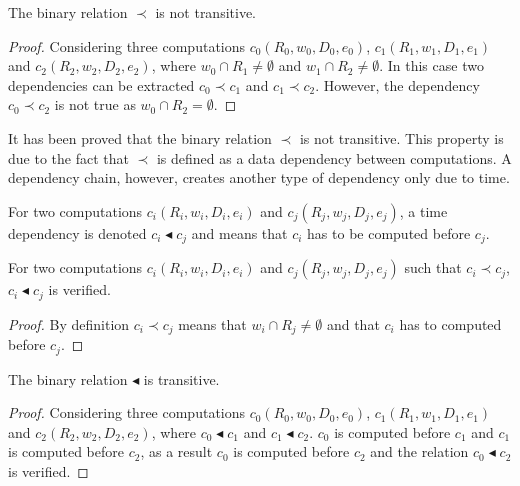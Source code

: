 \begin{myprop}
The binary relation $\prec$ is not transitive. 
\end{myprop}

\begin{proof}
Considering three computations $c_0(R_0,w_0,D_0,e_0)$, $c_1(R_1,w_1,D_1,e_1)$ and $c_2(R_2,w_2,D_2,e_2)$, where $w_0\cap R_1 \neq \emptyset$ and $w_1\cap R_2 \neq \emptyset$. In this case two dependencies can be extracted $c_0 \prec c_1$ and $c_1 \prec c_2$. However, the dependency $c_0 \prec c_2$ is not true as $w_0\cap R_2 = \emptyset$.
\end{proof}

It has been proved that the binary relation $\prec$ is not transitive. This property is due to the fact that $\prec$ is defined as a data dependency between computations. A dependency chain, however, creates another type of dependency only due to time.

\begin{mydef}
For two computations $c_i(R_i,w_i,D_i,e_i)$ and $c_j(R_j,w_j,D_j,e_j)$, a time dependency is denoted $c_i \blacktriangleleft c_j$ and means that $c_i$ has to be computed before $c_j$.
\end{mydef}

\begin{myprop}
For two computations $c_i(R_i,w_i,D_i,e_i)$ and $c_j(R_j,w_j,D_j,e_j)$ such that $c_i \prec c_j$, $c_i \blacktriangleleft c_j$ is verified.
\end{myprop}

\begin{proof}
By definition $c_i \prec c_j$ means that $w_i\cap R_j \neq \emptyset$ and that $c_i$ has to computed before $c_j$. %
\end{proof}

\begin{myprop}
The binary relation $\blacktriangleleft$ is transitive. 
\end{myprop}

\begin{proof}
Considering three computations $c_0(R_0,w_0,D_0,e_0)$, $c_1(R_1,w_1,D_1,e_1)$ and $c_2(R_2,w_2,D_2,e_2)$, where $c_0 \blacktriangleleft c_1$ and $c_1 \blacktriangleleft c_2$. $c_0$ is computed before $c_1$ and $c_1$ is computed before $c_2$, as a result $c_0$ is computed before $c_2$ and the relation $c_0 \blacktriangleleft c_2$ is verified. 
\end{proof}

